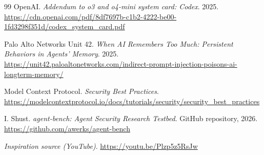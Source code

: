 \documentclass[11pt,a4paper]{report}
\begin{document}
\begin{thebibliography}{99}
OpenAI.
\emph{Addendum to o3 and o4-mini system card: Codex}.
2025.
\url{https://cdn.openai.com/pdf/8df7697b-c1b2-4222-be00-1fd3298f351d/codex_system_card.pdf}

Palo Alto Networks Unit 42.
\emph{When AI Remembers Too Much: Persistent Behaviors in Agents' Memory}.
2025.
\url{https://unit42.paloaltonetworks.com/indirect-prompt-injection-poisons-ai-longterm-memory/}

Model Context Protocol.
\emph{Security Best Practices}.
\url{https://modelcontextprotocol.io/docs/tutorials/security/security_best_practices}

I. Shust.
\emph{agent-bench: Agent Security Research Testbed}.
GitHub repository, 2026.
\url{https://github.com/awerks/agent-bench}

\emph{Inspiration source (YouTube)}.
\url{https://youtu.be/Plzp5z5RsJw}

\end{thebibliography}
\end{document}

